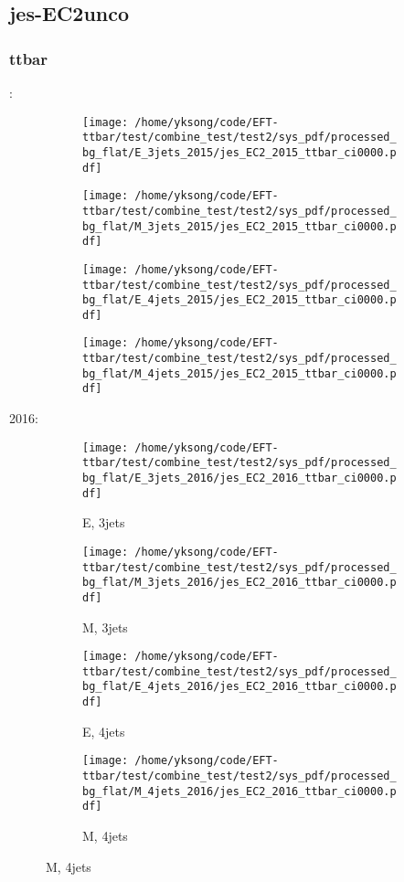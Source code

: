 \documentclass{beamer}
\begin{document}
\subsection{jes-EC2unco}

\begin{frame}
\frametitle{ttbar}
\fontsize{5}{1}:
\begin{figure}
\centering
\begin{subfigure}[b]{0.24\textwidth}
\texttt{[image: /home/yksong/code/EFT-ttbar/test/combine\_test/test2/sys\_pdf/processed\_bg\_flat/E\_3jets\_2015/jes\_EC2\_2015\_ttbar\_ci0000.pdf]}
\end{subfigure}
\begin{subfigure}[b]{0.24\textwidth}
\texttt{[image: /home/yksong/code/EFT-ttbar/test/combine\_test/test2/sys\_pdf/processed\_bg\_flat/M\_3jets\_2015/jes\_EC2\_2015\_ttbar\_ci0000.pdf]}
\end{subfigure}
\begin{subfigure}[b]{0.24\textwidth}
\texttt{[image: /home/yksong/code/EFT-ttbar/test/combine\_test/test2/sys\_pdf/processed\_bg\_flat/E\_4jets\_2015/jes\_EC2\_2015\_ttbar\_ci0000.pdf]}
\end{subfigure}
\begin{subfigure}[b]{0.24\textwidth}
\texttt{[image: /home/yksong/code/EFT-ttbar/test/combine\_test/test2/sys\_pdf/processed\_bg\_flat/M\_4jets\_2015/jes\_EC2\_2015\_ttbar\_ci0000.pdf]}
\end{subfigure}
\end{figure}
2016:
\begin{figure}
\centering
\begin{subfigure}[b]{0.24\textwidth}
\texttt{[image: /home/yksong/code/EFT-ttbar/test/combine\_test/test2/sys\_pdf/processed\_bg\_flat/E\_3jets\_2016/jes\_EC2\_2016\_ttbar\_ci0000.pdf]}
\captionsetup{font=tiny}
\caption{E, 3jets}
\end{subfigure}
\begin{subfigure}[b]{0.24\textwidth}
\texttt{[image: /home/yksong/code/EFT-ttbar/test/combine\_test/test2/sys\_pdf/processed\_bg\_flat/M\_3jets\_2016/jes\_EC2\_2016\_ttbar\_ci0000.pdf]}
\captionsetup{font=tiny}
\caption{M, 3jets}
\end{subfigure}
\begin{subfigure}[b]{0.24\textwidth}
\texttt{[image: /home/yksong/code/EFT-ttbar/test/combine\_test/test2/sys\_pdf/processed\_bg\_flat/E\_4jets\_2016/jes\_EC2\_2016\_ttbar\_ci0000.pdf]}
\captionsetup{font=tiny}
\caption{E, 4jets}
\end{subfigure}
\begin{subfigure}[b]{0.24\textwidth}
\texttt{[image: /home/yksong/code/EFT-ttbar/test/combine\_test/test2/sys\_pdf/processed\_bg\_flat/M\_4jets\_2016/jes\_EC2\_2016\_ttbar\_ci0000.pdf]}
\captionsetup{font=tiny}
\caption{M, 4jets}
\end{subfigure}
\end{figure}
\end{frame}
\end{document}
